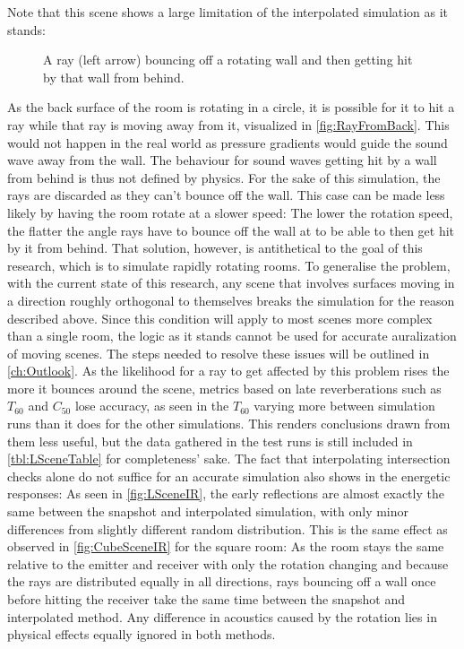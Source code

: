 Note that this scene shows a large limitation of the interpolated simulation as it stands:
\begin{figure}[t!]
    \begin{center}
        
    \end{center}
    \caption{A ray (left arrow) bouncing off a rotating wall and then getting hit by that wall from behind.}\label{fig:RayFromBack}
\end{figure}
As the back surface of the room is rotating in a circle,
it is possible for it to hit a ray while that ray is moving away from it,
visualized in \autoref{fig:RayFromBack}.
This would not happen in the real world as pressure gradients would guide the sound wave away from the wall.
\newline
The behaviour for sound waves getting hit by a wall from behind is thus not defined by physics.
For the sake of this simulation, the rays are discarded as they can't bounce off the wall.
This case can be made less likely by having the room rotate at a slower speed:
The lower the rotation speed, the flatter the angle rays have to bounce off the wall at to be able to then get hit by it from behind.
That solution, however, is antithetical to the goal of this research, which is to simulate rapidly rotating rooms.
\newline
To generalise the problem, with the current state of this research,
any scene that involves surfaces moving in a direction roughly orthogonal to themselves breaks the simulation for the reason described above.
Since this condition will apply to most scenes more complex than a single room,
the logic as it stands cannot be used for accurate auralization of moving scenes.
The steps needed to resolve these issues will be outlined in \autoref{ch:Outlook}.
\newline
As the likelihood for a ray to get affected by this problem rises the more it bounces around the scene,
metrics based on late reverberations such as \(T_{60}\) and \(C_{50}\) lose accuracy,
as seen in the \(T_{60}\) varying more between simulation runs than it does for the other simulations.
This renders conclusions drawn from them less useful,
but the data gathered in the test runs is still included in \autoref{tbl:LSceneTable} for completeness' sake.
\newline
The fact that interpolating intersection checks alone do not suffice for an accurate simulation also shows in the energetic responses:
As seen in \autoref{fig:LSceneIR}, the early reflections are almost exactly the same between the snapshot and interpolated simulation,
with only minor differences from slightly different random distribution.
This is the same effect as observed in \autoref{fig:CubeSceneIR} for the square room:
As the room stays the same relative to the emitter and receiver with only the rotation changing
and because the rays are distributed equally in all directions,
rays bouncing off a wall once before hitting the receiver take the same time between the snapshot and interpolated method.
Any difference in acoustics caused by the rotation lies in physical effects equally ignored in both methods.

